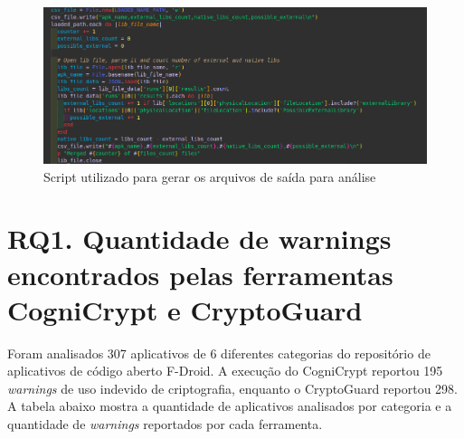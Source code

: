 \begin{figure}[!ht]
  \centering
  \includegraphics[scale=0.4]{img/output_script_counter.png}
  \caption{Script utilizado para gerar os arquivos de saída para análise}
  \label{img: output_script}
\end{figure}

\FloatBarrier


\section{RQ1. Quantidade de warnings encontrados pelas ferramentas CogniCrypt e CryptoGuard}

Foram analisados 307 aplicativos de 6 diferentes categorias do repositório de aplicativos de código aberto F-Droid. A execução do CogniCrypt reportou 195 \textit{warnings} de uso indevido de criptografia, enquanto o CryptoGuard reportou 298. A tabela abaixo mostra a quantidade de aplicativos analisados por categoria e a quantidade de \textit{warnings} reportados por cada ferramenta.


